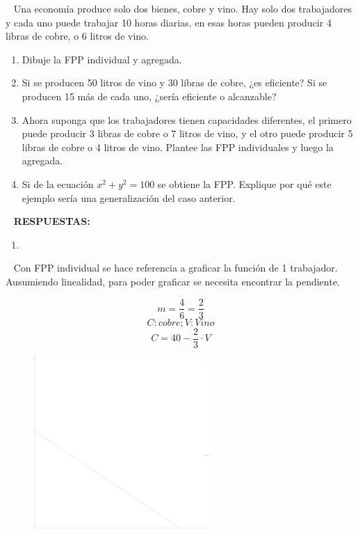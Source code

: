 \documentclass[
  letterpaper,
  DIV=11,
  numbers=noendperiod]{scrreport}
\providecommand{\tightlist}{%
  \setlength{\itemsep}{0pt}\setlength{\parskip}{0pt}}\usepackage{longtable,booktabs,array}
\begin{document}
~ Una economía produce solo dos bienes, cobre y vino. Hay solo dos
trabajadores y cada uno puede trabajar 10 horas diarias, en esas horas
pueden producir 4 libras de cobre, o 6 litros de vino.

\begin{enumerate}
\def\labelenumi{\alph{enumi})}
\item
  Dibuje la FPP individual y agregada.
\item
  Si se producen 50 litros de vino y 30 libras de cobre, ¿es eficiente?
  Si se producen 15 más de cada uno, ¿sería eficiente o alcanzable?
\item
  Ahora suponga que los trabajadores tienen capacidades diferentes, el
  primero puede producir 3 libras de cobre o 7 litros de vino, y el otro
  puede producir 5 libras de cobre o 4 litros de vino. Plantee las FPP
  individuales y luego la agregada.
\item
  Si de la ecuación \(x^2+y^2 = 100\) se obtiene la FPP. Explique por
  qué este ejemplo sería una generalización del caso anterior.
\end{enumerate}

~ \textbf{RESPUESTAS:}

\begin{enumerate}
\def\labelenumi{\alph{enumi})}
\tightlist
\item
\end{enumerate}

~ Con FPP individual se hace referencia a graficar la función de 1
trabajador. Ausumiendo linealidad, para poder graficar se necesita
encontrar la pendiente.

\[m=\frac{4}{6}=\frac{2}{3}\] \[C: cobre ; V: Vino\]
\[C=40-\frac{2}{3}\cdot V\]

\begin{figure}

{\centering \includegraphics[width=0.6\textwidth,height=\textheight]{7,8titulo_files/figure-pdf/unnamed-chunk-2-1.pdf}

}

\end{figure}
\end{document}
